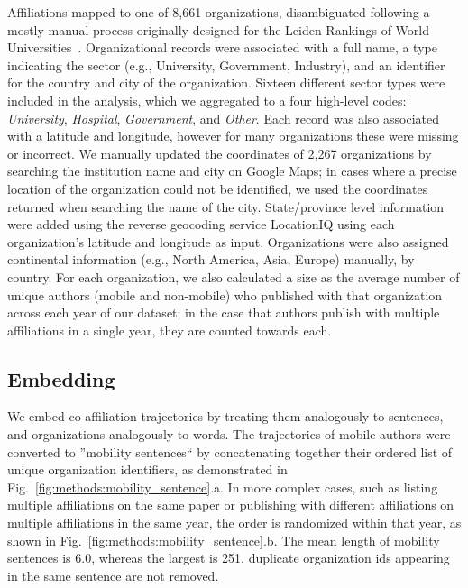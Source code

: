 \documentclass[12pt]{article} %
\begin{document}
Affiliations mapped to one of 8,661 organizations, disambiguated following a mostly manual process originally designed for the Leiden Rankings of World Universities~\cite{waltman2012leidenrankings}. 
Organizational records were associated with a full name, a type indicating the sector (e.g., University, Government, Industry), and an identifier for the country and city of the organization. 
Sixteen different sector types were included in the analysis, which we aggregated to a four high-level codes: \textit{University}, \textit{Hospital}, \textit{Government}, and \textit{Other}. 
Each record was also associated with a latitude and longitude, however for many organizations these were missing or incorrect. We manually updated the coordinates of 2,267 organizations by searching the institution name and city on Google Maps;
in cases where a precise location of the organization could not be identified, we used the coordinates returned when searching the name of the city.
State/province level  information were added using the reverse geocoding service LocationIQ using each organization's latitude and longitude as input. 
Organizations were also assigned continental information (e.g., North America, Asia, Europe) manually, by country. 
For each organization, we also calculated a size as the average number of unique authors (mobile and non-mobile) who published with that organization across each year of our dataset;
in the case that authors publish with multiple affiliations in a single year, they are counted towards each. 


\subsection*{Embedding}
We embed co-affiliation trajectories by treating them analogously to sentences, and organizations analogously to words. 
The trajectories of mobile authors were converted to ''mobility sentences`` by concatenating together their ordered list of unique organization identifiers, as demonstrated in Fig.~\ref{fig:methods:mobility_sentence}.a.
In more complex cases, such as listing multiple affiliations on the same paper or publishing with different affiliations on multiple affiliations in the same year, the order is randomized within that year, as shown in  Fig.~\ref{fig:methods:mobility_sentence}.b. 
The mean length of mobility sentences is 6.0, whereas the largest is 251.
duplicate organization ids appearing in the same sentence are not removed. 
\end{document}
